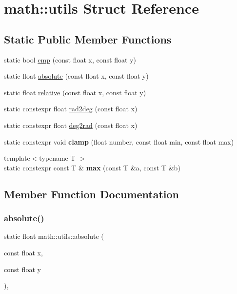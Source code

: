 \hypertarget{structmath_1_1utils}{}\section{math\+:\+:utils Struct Reference}
\label{structmath_1_1utils}
\subsection*{Static Public Member Functions}
\begin{DoxyCompactItemize}
\item 
static bool \hyperlink{structmath_1_1utils_ac138b736f332b03adfac51baaad6027a}{cmp} (const float x, const float y)
\item 
static float \hyperlink{structmath_1_1utils_a265204da63fa1192c173c4944ec67363}{absolute} (const float x, const float y)
\item 
static float \hyperlink{structmath_1_1utils_ae8c19c230a03b2a8b8ca6f3604fa4648}{relative} (const float x, const float y)
\item 
static constexpr float \hyperlink{structmath_1_1utils_aea1d3fa9a81bce6626a0bb6d2ef3d982}{rad2deg} (const float x)
\item 
static constexpr float \hyperlink{structmath_1_1utils_a321e2eedf82d272a8b92e774f9060c0b}{deg2rad} (const float x)
\item 
\mbox{\label{structmath_1_1utils_ab7925a5c5edb6a7c6afb60c9a0e13777}} 
static constexpr void {\bfseries clamp} (float number, const float min, const float max)
\item 
\mbox{\label{structmath_1_1utils_aa5fb0b44f2916e472e48b5a0c77e7550}} 
{\footnotesize template$<$typename T $>$ }\\static constexpr const T \& {\bfseries max} (const T \&a, const T \&b)
\end{DoxyCompactItemize}


\subsection{Member Function Documentation}
\mbox{\label{structmath_1_1utils_a265204da63fa1192c173c4944ec67363}} 
\subsubsection{\texorpdfstring{absolute()}{absolute()}}
{\footnotesize\ttfamily static float math\+::utils\+::absolute (\begin{DoxyParamCaption}\item[{const float}]{x,  }\item[{const float}]{y }\end{DoxyParamCaption})\hspace{0.3cm}{\ttfamily [inline]}, {\ttfamily [static]}}

